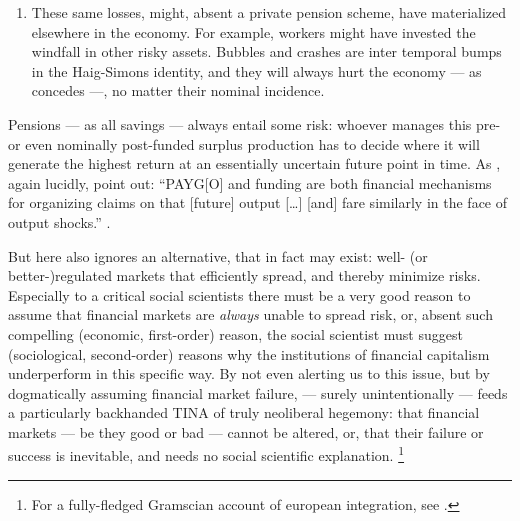 \begin{enumerate}
{\begin{enumerate}
			\item These same losses, might, absent a private pension scheme, have materialized elsewhere in the economy.
			For example, workers might have invested the windfall in other risky assets.
			Bubbles and crashes are inter temporal bumps in the Haig-Simons identity, and they will always hurt the economy --- as \citet[340]{Cerami2009a} concedes ---, no matter their nominal incidence.
		\end{enumerate}
	}
	Pensions --- as all savings --- always entail some risk:
	whoever manages this pre- or even nominally post-funded surplus production has to decide where it will generate the highest return at an essentially uncertain future point in time.
	As \citeauthor{Barr2005a}, again lucidly, point out:
	``PAYG[O] and funding are both financial mechanisms for organizing claims on that [future] output [\ldots] [and] fare similarly in the face of output shocks.'' \citeyearpar[156]{Barr2005a}.

	But \citeauthor{Cerami2009a} here also ignores an alternative, that in fact may exist:
	well- (or better-)regulated markets that efficiently spread, and thereby minimize risks.
	Especially to a critical social scientists there must be a very good reason to assume that financial markets are \emph{always} unable to spread risk, or, absent such compelling (economic, first-order) reason, the social scientist must suggest (sociological, second-order) reasons why the institutions of financial capitalism underperform in this specific way.
	By not even alerting us to this issue, but by dogmatically assuming financial market failure, \citeauthor{Cerami2009a} --- surely unintentionally --- feeds a particularly backhanded TINA of truly neoliberal hegemony:
	that financial markets --- be they good or bad --- cannot be altered, or, that their failure or success is inevitable, and needs no social scientific explanation.
	\footnote{
		For a fully-fledged Gramscian account of european integration, see \cite{Bieler2002,Bieler2003,Bieler2005}.
	}


\end{enumerate}
